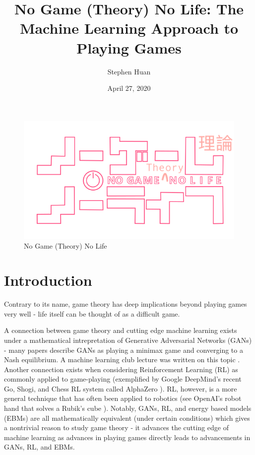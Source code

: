 \documentclass[11pt, oneside]{article}
\title{No Game (Theory) No Life: The Machine Learning Approach to Playing Games}
\author{Stephen Huan}
\date{April 27, 2020}
\begin{document}
\maketitle

\begin{figure}[h!]
  \centering
  \includegraphics[scale=0.40]{no_game_theory_no_life}
  \caption{No Game (Theory) No Life \cite{ngnl}}
\end{figure}

\section{Introduction}

Contrary to its name, game theory has deep implications beyond playing
games very well - life itself can be thought of as a difficult game.

A connection between game theory and cutting edge machine learning exists
under a mathematical intrepretation of Generative Adversarial Networks (GANs)
- many papers describe GANs as playing a minimax game and converging to a Nash equilibrium.
A machine learning club lecture was written on this topic \cite{thistlethwaite}.
Another connection exists when considering Reinforcement Learning (RL) as
commonly applied to game-playing (exemplified by Google DeepMind's recent
Go, Shogi, and Chess RL system called AlphaZero \cite{DBLP:journals/corr/abs-1712-01815}).
RL, however, is a more general technique that has often been applied
to robotics (see OpenAI's robot hand that solves a Rubik's cube \cite{2019arXiv191007113O}).
Notably, GANs, RL,
and energy based models (EBMs) are all mathematically equivalent (under certain conditions)
\cite{DBLP:journals/corr/FinnCAL16} which gives a nontrivial reason to study game theory -
it advances the cutting edge of machine learning as advances in playing games
directly leads to advancements in GANs, RL, and EBMs.
\end{document}
